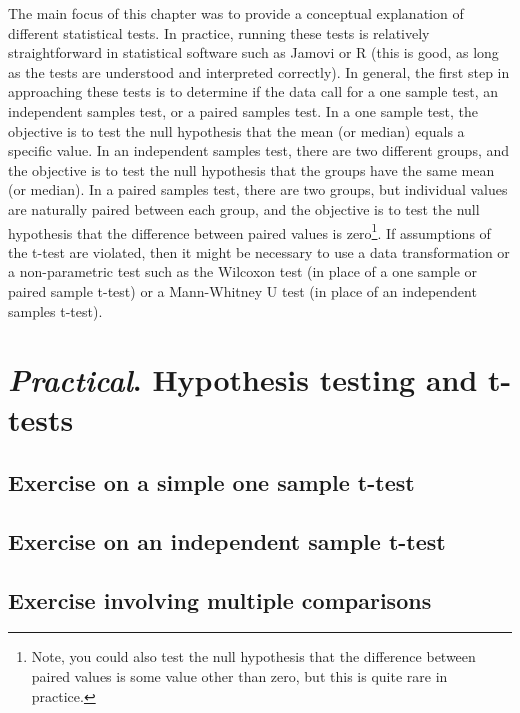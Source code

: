 \documentclass[
]{scrbook}
\begin{document}
The main focus of this chapter was to provide a conceptual explanation of different statistical tests.
In practice, running these tests is relatively straightforward in statistical software such as Jamovi or R (this is good, as long as the tests are understood and interpreted correctly).
In general, the first step in approaching these tests is to determine if the data call for a one sample test, an independent samples test, or a paired samples test.
In a one sample test, the objective is to test the null hypothesis that the mean (or median) equals a specific value.
In an independent samples test, there are two different groups, and the objective is to test the null hypothesis that the groups have the same mean (or median).
In a paired samples test, there are two groups, but individual values are naturally paired between each group, and the objective is to test the null hypothesis that the difference between paired values is zero\footnote{Note, you could also test the null hypothesis that the difference between paired values is some value other than zero, but this is quite rare in practice.}.
If assumptions of the t-test are violated, then it might be necessary to use a data transformation or a non-parametric test such as the Wilcoxon test (in place of a one sample or paired sample t-test) or a Mann-Whitney U test (in place of an independent samples t-test).

\hypertarget{Chapter_22}{%
\chapter{\texorpdfstring{\emph{Practical}. Hypothesis testing and t-tests}{Practical. Hypothesis testing and t-tests}}\label{Chapter_22}}

\hypertarget{exercise-on-a-simple-one-sample-t-test}{%
\section{Exercise on a simple one sample t-test}\label{exercise-on-a-simple-one-sample-t-test}}

\hypertarget{exercise-on-an-independent-sample-t-test}{%
\section{Exercise on an independent sample t-test}\label{exercise-on-an-independent-sample-t-test}}

\hypertarget{exercise-involving-multiple-comparisons}{%
\section{Exercise involving multiple comparisons}\label{exercise-involving-multiple-comparisons}}
\end{document}

